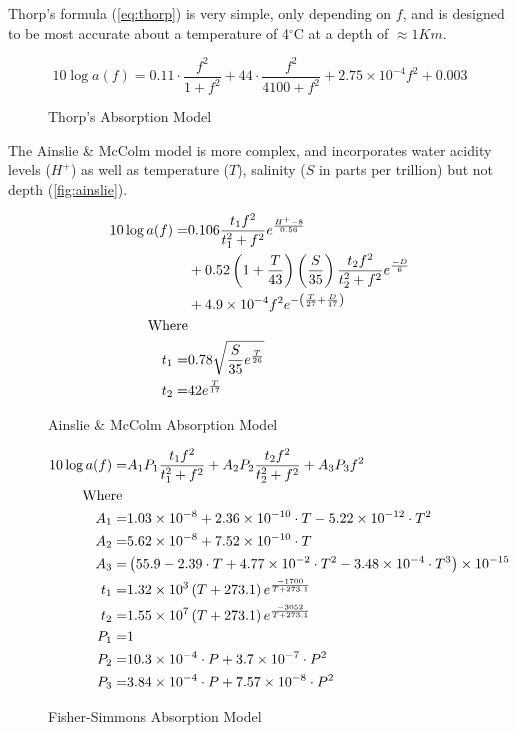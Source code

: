 Thorp's formula (\autoref{eq:thorp}) is very simple, only depending on $f$, and is designed to be most accurate about a temperature of 4$^{\circ}$C at a depth of $\approx 1Km$.
%
\begin{figure}
  \begin{equation}
    10 \log a(f) = 0.11 \cdot \frac{f^2}{1+f^2} + 44\cdot\frac{f^2}{4100+f^2}+ 2.75\times10^{-4} f^2 + 0.003
    \label{eq:thorp}
  \end{equation}
  \caption[Thorp's formula]{Thorp's Absorption Model~\cite{Stojanovic2007}}
    \label{fig:thorp}
\end{figure}
%
The Ainslie \& McColm model is more complex, and incorporates water acidity levels ($H^+$) as well as temperature ($T$), salinity ($S$ in parts per trillion) but not depth (\autoref{fig:ainslie}).
%
\begin{figure}
  \begin{align}
    10 \log a(f) =& 0.106 \frac{t_1 f^2}{t_1^2 + f^2} e^{\frac{H^+-8}{0.56}}\\\notag
      & + 0.52 \left(1+\frac{T}{43}\right)\left(\frac{S}{35}\right)\frac{t_2f^2}{t_2^2+f^2} e^{\frac{-D}{6}}\\\notag
      & + 4.9 \times 10^{-4} f^2e^{-\left(\frac{T}{27}+\frac{D}{17}\right)}\\\notag
      \text{Where}&\\\notag
      t_1 =& 0.78 \sqrt{\frac{S}{35}e^{\frac{T}{26}}}\\\notag
      t_2 =& 42 e^{\frac{T}{17}}\notag
      \label{eq:ainslie}
  \end{align}
  \caption{Ainslie \& McColm Absorption Model}
  \label{fig:ainslie}
\end{figure}
%
\begin{figure}
  \begin{align}
    10 \log a(f)=& A_1P_1\frac{t_1f^2}{t_1^2+f^2} + A_2P_2\frac{t_2f^2}{t_2^2+f^2} + A_3P_3f^2\\\notag
    \text{Where }&\\\notag
    A_1=&1.03\times 10^{-8} + 2.36\times 10^{-10} \cdot T -5.22 \times 10^{-12}\cdot T^2\\\notag
    A_2=&5.62\times 10^{-8} + 7.52\times 10^{-10} \cdot T\\\notag
    A_3=&\left(55.9 - 2.39\cdot T + 4.77\times 10^{-2}\cdot T^2 - 3.48 \times 10^{-4}\cdot T^3\right) \times 10 ^{-15}\\\notag
    t_1=&1.32\times 10^3\left(T+273.1\right)e^{\frac{-1700}{T+273.1}}\\\notag
    t_2=&1.55\times 10^7\left(T+273.1\right)e^{\frac{-3052}{T+273.1}}\\\notag
    P_1=&1\\\notag
    P_2=&\-10.3\times 10^{-4}\cdot P + 3.7\times 10^{-7}\cdot P^2\\\notag
    P_3=&\-3.84\times 10^{-4}\cdot P + 7.57\times 10^{-8}\cdot P^2\notag
    \label{eq:fisher}
  \end{align}
  \caption{Fisher-Simmons Absorption Model}
  \label{fig:fisher}
\end{figure}

